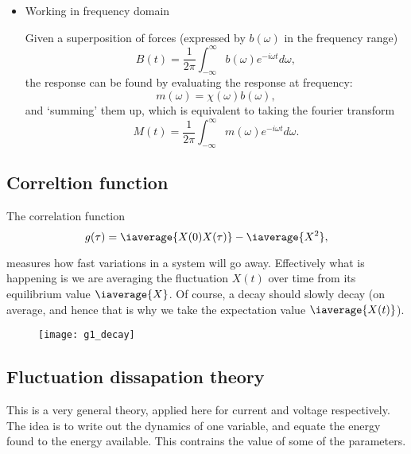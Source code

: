 \begin{itemize}
\item Working in frequency domain
  \begin{framed}\noindent
    Given  a superposition  of forces  (expressed by  $ b(\omega)  $ in  the
    frequency range)
    \begin{equation}\label{eqn:freq_2}
      B(t)     =    \frac{1}{2\pi}\int_{-\infty}^{\infty}b(\omega)e^{-i\omega
        t}d\omega,
    \end{equation}
    \noindent the response  can be found by evaluating  the response at
    frequency:
    \begin{equation}\label{eqn:freq_3}
      m(\omega) = \chi(\omega)b(\omega),
    \end{equation}
    \noindent and `summing' them up,  which is equivalent to taking the
    fourier transform
    \begin{equation}\label{eqn:freq_4}
      M(t)     =    \frac{1}{2\pi}\int_{-\infty}^{\infty}m(\omega)e^{-i\omega
        t}d\omega.
    \end{equation}
  \end{framed}
\end{itemize}


  \subsection{Correltion function}
  The correlation function
  \begin{equation}\label{eqn:corr1}
    g(\tau) = \iaverage{X(0)X(\tau)} - \iaverage{X^2},
  \end{equation}

  \noindent  measures how  fast variations  in a  system will  go away.
  Effectively what  is happening  is we  are averaging  the fluctuation
  $ X(t)  $ over time from  its equilibrium value $  \iaverage{X} $. Of
  course, a  decay should slowly decay  (on average, and hence  that is
  why we take the expectation value $ \iaverage{X(t)} $).

\begin{figure}[h]
  \centering \texttt{[image: g1\_decay]}
\end{figure}

\noindent


 \subsection{Fluctuation dissapation theory}\label{subsec:fluctuationDissapation}
 This is  a very general theory,  applied here for current  and voltage
 respectively. The idea  is to write out the dynamics  of one variable,
 and equate the  energy found to the energy  available.  This contrains
 the value of some of the parameters.

